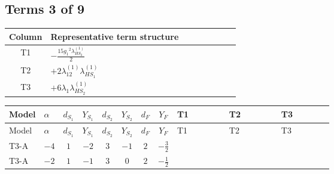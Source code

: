 \documentclass[8pt]{article}
\begin{document}
\begin{landscape}
\subsection*{Terms 3 of 9}
\begin{center}
\begin{tabular}{@{}c >{\raggedright\arraybackslash}p{0.82\linewidth}@{}}
\toprule
Column & Representative term structure \\
\midrule
T1 & \(\displaystyle -\frac{15 {g_1}^2 {\lambda_{HS_2}^{(1)}}}{2}\) \\
\midrule
T2 & \(\displaystyle +2 {\lambda_{12}^{(1)}} {\lambda_{HS_1}^{(1)}}\) \\
\midrule
T3 & \(\displaystyle +6 {\lambda_1} {\lambda_{HS_2}^{(1)}}\) \\
\midrule
\bottomrule
\end{tabular}
\end{center}
\smallskip
\tiny
\begin{longtable}{@{}llcccccc >{\raggedright\arraybackslash}p{0.21\linewidth} >{\raggedright\arraybackslash}p{0.21\linewidth} >{\raggedright\arraybackslash}p{0.21\linewidth}@{}}
\toprule
Model & $\alpha$ & $d_{S_1}$ & $Y_{S_1}$ & $d_{S_2}$ & $Y_{S_2}$ & $d_F$ & $Y_F$ & T1 & T2 & T3 \\
\midrule
\endfirsthead
\toprule
Model & $\alpha$ & $d_{S_1}$ & $Y_{S_1}$ & $d_{S_2}$ & $Y_{S_2}$ & $d_F$ & $Y_F$ & T1 & T2 & T3 \\
\midrule
\endhead
T3-A & $-4$ & $1$ & $-2$ & $3$ & $-1$ & $2$ & $-\frac{3}{2}$ & \scriptsize\adjustbox{max width=\linewidth}{$\begin{gathered} -\frac{15 {g_1}^2 {\lambda_{HS_2}^{(1)}}}{2}\end{gathered}$} & \scriptsize\adjustbox{max width=\linewidth}{$\begin{gathered} +2 {\lambda_{12}^{(1)}} {\lambda_{HS_1}^{(1)}}\end{gathered}$} & \scriptsize\adjustbox{max width=\linewidth}{$\begin{gathered} +6 {\lambda_1} {\lambda_{HS_2}^{(1)}}\end{gathered}$} \\
\midrule
T3-A & $-2$ & $1$ & $-1$ & $3$ & $0$ & $2$ & $-\frac{1}{2}$ & \scriptsize\adjustbox{max width=\linewidth}{$\begin{gathered} -\frac{3 {g_1}^2 {\lambda_{HS_2}^{(1)}}}{2}\end{gathered}$} & \scriptsize\adjustbox{max width=\linewidth}{$\begin{gathered} +2 {\lambda_{12}^{(1)}} {\lambda_{HS_1}^{(1)}}\end{gathered}$} & \scriptsize\adjustbox{max width=\linewidth}{$\begin{gathered} +6 {\lambda_1} {\lambda_{HS_2}^{(1)}}\end{gathered}$} \\

\end{longtable}
\end{landscape}
\end{document}
